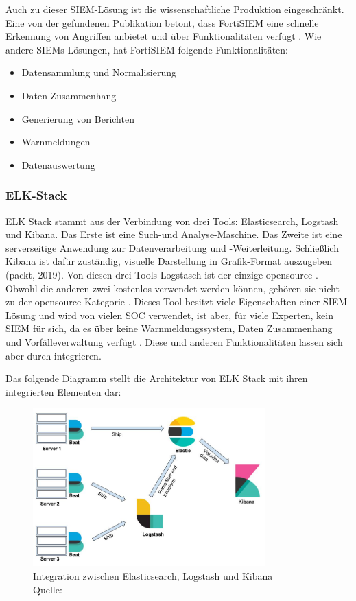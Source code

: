 \newpage
Auch zu dieser \gls{SIEM}-Lösung ist die wissenschaftliche Produktion eingeschränkt. Eine von der gefundenen Publikation betont, dass FortiSIEM eine schnelle Erkennung von Angriffen anbietet und über   Funktionalitäten verfügt \citep{Ramires_fortisiem}. Wie andere \glspl{SIEM} Lösungen, hat FortiSIEM folgende Funktionalitäten:

\begin{itemize}[noitemsep]
   \item Datensammlung und Normalisierung
   \item Daten Zusammenhang
   \item Generierung von Berichten
   \item Warnmeldungen
   \item Datenauswertung
\end{itemize}

\subsubsection{ELK-Stack}
ELK Stack stammt aus der Verbindung von drei Tools: Elasticsearch, Logstash und Kibana. Das Erste ist eine Such-und Analyse-Maschine. Das Zweite ist eine serverseitige Anwendung zur Datenverarbeitung und -Weiterleitung. Schließlich Kibana \label{kibana} ist dafür zuständig, visuelle Darstellung in Grafik-Format auszugeben (packt, 2019). Von diesen drei Tools Logstasch ist der einzige \gls{opensource} \citep{elastic_OSI}. Obwohl die anderen zwei 
kostenlos verwendet werden können, gehören sie nicht zu der \gls{opensource} Kategorie \citep{OpenSource_Def}. Dieses Tool besitzt viele Eigenschaften einer \gls{SIEM}-Lösung und wird von vielen SOC verwendet, ist aber, für viele Experten, kein \gls{SIEM} für sich, da es über keine Warnmeldungssystem, Daten Zusammenhang und Vorfälleverwaltung verfügt \citep{Miller_ELK}. Diese und anderen Funktionalitäten lassen sich aber durch  integrieren. 

\newpage
Das folgende Diagramm stellt die Architektur von ELK Stack mit ihren integrierten Elementen dar:

\begin{figure}[H]
   \centering
   \includegraphics[width=0.8\textwidth]{assets/2_p8.png}
   \caption[Integration zwischen Elasticsearch, Logstash und Kibana]
   {Integration zwischen Elasticsearch, Logstash und Kibana\\Quelle: \citep{packt_elkstack} }
   \centering
\end{figure}

